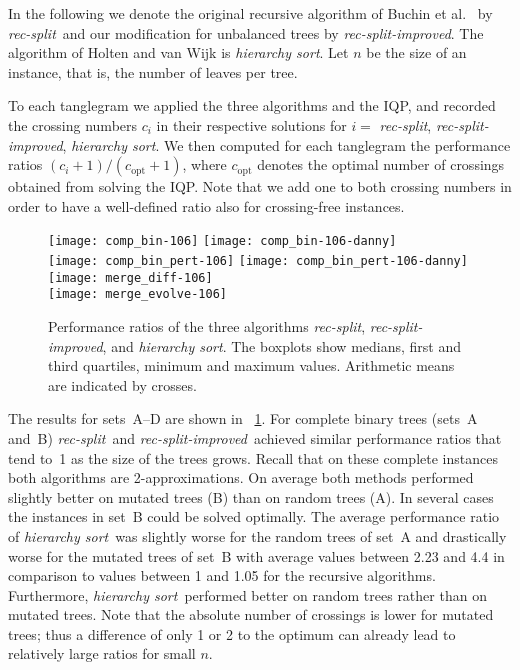 \documentclass[runningheads,a4paper]{llncs}
\newcommand{\recsplit}{\emph{rec-split}}
\newcommand{\recimproved}{\emph{rec-split-improved}}
\newcommand{\hiersort}{\emph{hierarchy sort}}
\begin{document}
In the following we denote the original recursive 
algorithm of Buchin et al.~\cite{bbbnow-dbtha-08} by \recsplit\ and
our modification for unbalanced trees by 
\recimproved. The algorithm of Holten and van Wijk is 
\hiersort.  Let $n$ be the size of an instance, that is, the number of
leaves per tree. 

To each tanglegram we applied the three algorithms and the IQP, and
recorded the crossing numbers $c_i$ in their respective solutions for
$i =$ \recsplit, \recimproved, \hiersort.  We then computed for each
tanglegram the performance ratios $(c_i + 1)/(c_\mathrm{opt} + 1)$,
where $c_\mathrm{opt}$ denotes the optimal number of crossings
obtained from solving the IQP. Note that we add one to both crossing
numbers in order to have a well-defined ratio also for crossing-free
instances.

\begin{figure}[tbp]
  \centering
  \texttt{[image: comp\_bin-106]}
  \hfill
  \texttt{[image: comp\_bin-106-danny]}\\
  \texttt{[image: comp\_bin\_pert-106]}
  \hfill
  \texttt{[image: comp\_bin\_pert-106-danny]}\\
  \texttt{[image: merge\_diff-106]}\\
  \texttt{[image: merge\_evolve-106]}
  \caption{Performance ratios of the three algorithms \recsplit,
    \recimproved, and \hiersort.  The boxplots show medians, first and
    third quartiles, minimum and maximum values. Arithmetic means are
    indicated by crosses.}
  \label{fig:ratio}
\end{figure}

The results for sets~A--D are shown in \figurename~\ref{fig:ratio}.
For complete binary trees (sets~A and~B) \recsplit\ and \recimproved\
achieved similar performance ratios that tend to~1 as the size of the
trees grows.  Recall that on these complete instances both algorithms
are 2-approximations. On average both methods performed slightly
better on mutated trees (B) than on random trees (A).  In several
cases the instances in set~B could be solved optimally. The average
performance ratio of \hiersort\ was slightly worse for the random trees
of set~A and drastically worse for the mutated trees of set~B with
average values between 2.23 and 4.4 in comparison to values between 1
and 1.05 for the recursive algorithms.  Furthermore, \hiersort\
performed better on random trees rather than on mutated trees. Note
that the absolute number of crossings is lower for mutated trees; thus
a difference of only 1 or 2 to the optimum can already lead to
relatively large ratios for small $n$.
\end{document}
